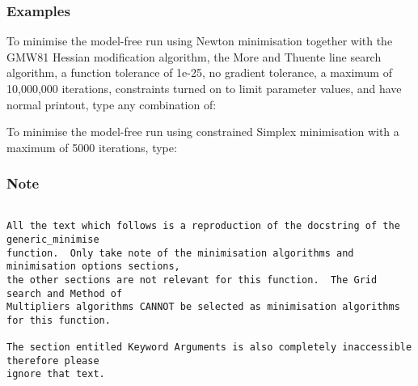 \subsubsection{Examples}

To minimise the model-free run  using Newton minimisation together with the GMW81 Hessian modification algorithm, the More and Thuente line search algorithm, a function tolerance of 1e-25, no gradient tolerance, a maximum of 10,000,000 iterations, constraints turned on to limit parameter values, and have normal printout, type any combination of:













To minimise the model-free run  using constrained Simplex minimisation with a maximum of 5000 iterations, type:




\subsubsection{Note}

{\footnotesize \begin{verbatim}

All the text which follows is a reproduction of the docstring of the generic_minimise
function.  Only take note of the minimisation algorithms and minimisation options sections,
the other sections are not relevant for this function.  The Grid search and Method of
Multipliers algorithms CANNOT be selected as minimisation algorithms for this function.

The section entitled Keyword Arguments is also completely inaccessible therefore please
ignore that text.

\end{verbatim}}

